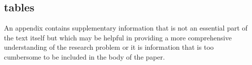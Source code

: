 \documentclass[pdflatex,sn-mathphys-num]{sn-jnl}%
\theoremstyle{thmstyleone}%
\theoremstyle{thmstyletwo}%
\theoremstyle{thmstylethree}%
\begin{document}
\begin{appendices}

\section{tables}\label{secA1}

An appendix contains supplementary information that is not an essential part of the text itself but which may be helpful in providing a more comprehensive understanding of the research problem or it is information that is too cumbersome to be included in the body of the paper.




\end{appendices}

\end{document}
